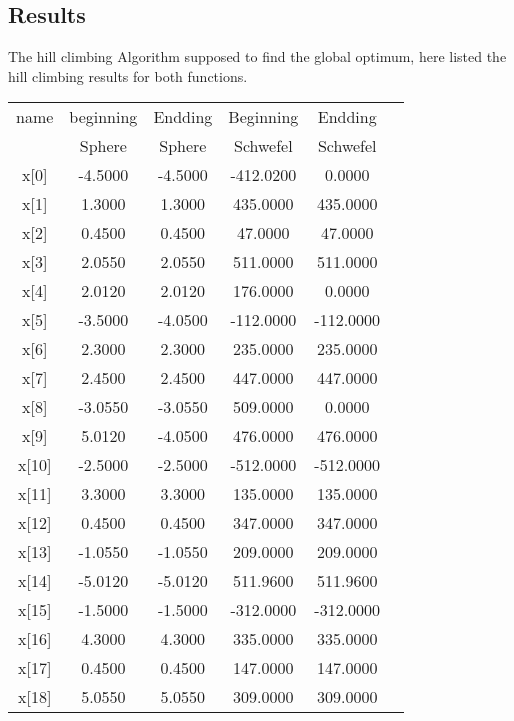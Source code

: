 \documentclass{article}
\begin{document}
\begin{CJK}{UTF8}{gbsn}
\section{Results}
The hill climbing Algorithm supposed to find the global optimum, here listed the hill climbing results for both functions. 

\begin{table}[!hbp]  
\begin{tabular}{|c|c|c|c|c|c|}   
\hline %
\hline %
name        & beginning        & Endding            & Beginning     & Endding \\
            & Sphere           & Sphere             & Schwefel      & Schwefel  \\
\hline
x[0]	&	-4.5000	&	-4.5000	&	-412.0200	&	  0.0000	\\
\hline
x[1]	&	1.3000	&	1.3000	&	435.0000	&	435.0000	\\
\hline
x[2]	&	0.4500	&	0.4500	&	47.0000  	&        47.0000	\\
\hline
x[3]	&	2.0550	&	2.0550	&	511.0000	&	511.0000	\\
\hline
x[4]	&	2.0120	&	2.0120	&	176.0000	&	  0.0000	\\
\hline
x[5]	&	-3.5000	&	-4.0500	&	-112.0000	&      -112.0000	\\
\hline
x[6]	&	2.3000	&	2.3000	&	235.0000	&	235.0000	\\
\hline
x[7]	&	2.4500	&	2.4500	&	447.0000	&	447.0000	\\
\hline
x[8]	&	-3.0550	&	-3.0550	&	509.0000	&	0.0000	\\
\hline
x[9]	&	5.0120	&	-4.0500	&	476.0000	&	476.0000	\\
\hline
x[10]	&	-2.5000	&	-2.5000	&	-512.0000	&	-512.0000	\\
\hline
x[11]	&	3.3000	&	3.3000	&	135.0000	&	135.0000	\\
\hline
x[12]	&	0.4500	&	0.4500	&	347.0000	&	347.0000	\\
\hline
x[13]	&	-1.0550	&	-1.0550	&	209.0000	&	209.0000	\\
\hline
x[14]	&	-5.0120	&	-5.0120	&	511.9600	&	511.9600	\\
\hline
x[15]	&	-1.5000	&	-1.5000	&	-312.0000	&	-312.0000	\\
\hline
x[16]	&	4.3000	&	4.3000	&	335.0000	&	335.0000	\\
\hline
x[17]	&	0.4500	&	0.4500	&	147.0000	&	147.0000	\\
\hline
x[18]	&	5.0550	&	5.0550	&	309.0000	&	309.0000	\\

\end{tabular}
\end{table}
\end{CJK}
\end{document}
